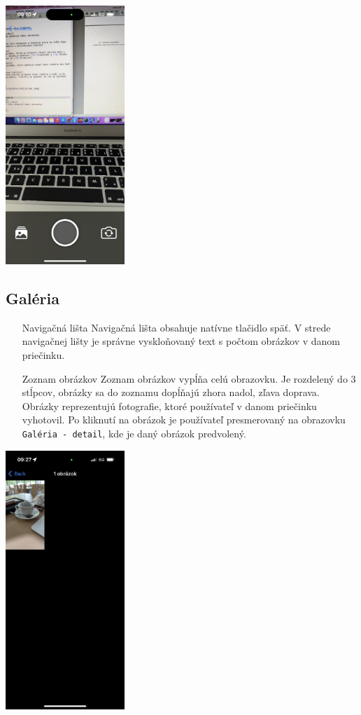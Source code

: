 \documentclass[11pt]{article} %
\begin{document}
\begin{center}
\includegraphics[width=4.5cm]{kamera.jpeg}
\end{center}

\pagebreak
\subsection{Galéria}
\begin{itemize}
\item[Navigačná lišta]{
	Navigačná lišta obsahuje natívne tlačidlo späť. V strede navigačnej lišty je správne vyskloňovaný text s počtom obrázkov v danom priečinku.
}
\item[Zoznam obrázkov]{
	Zoznam obrázkov vypĺňa celú obrazovku. Je rozdelený do 3 stĺpcov, obrázky sa do zoznamu dopĺňajú zhora nadol, zľava doprava. Obrázky reprezentujú fotografie, ktoré používateľ v danom priečinku vyhotovil. Po kliknutí na obrázok je používateľ presmerovaný na obrazovku {\tt Galéria - detail}, kde je daný obrázok predvolený.
}
\end{itemize}
\begin{center}
\includegraphics[width=4.5cm]{galeria.jpeg}
\end{center}
\end{document}

